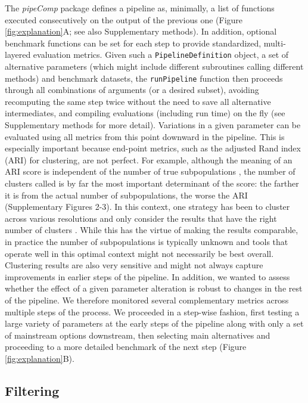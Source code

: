 \documentclass{bmcart}
\begin{document}
The \textit{pipeComp} package defines a pipeline as, minimally, a list of functions executed consecutively on the output of the previous one {\color{red}(Figure \ref{fig:explanation}A; see also Supplementary methods). In addition, optional benchmark functions can be set for each step to provide standardized, multi-layered evaluation metrics. Given such a \texttt{PipelineDefinition} object, a set of alternative parameters (which might include different subroutines calling different methods) and benchmark datasets, the \texttt{runPipeline} function then proceeds through all combinations of arguments (or a desired subset), avoiding recomputing the same step twice without the need to save all alternative intermediates, and compiling evaluations (including run time) on the fly (see Supplementary methods for more detail).} Variations in a given parameter can be evaluated using all metrics from this point downward in the pipeline. This is especially important because end-point metrics, such as the adjusted Rand index (ARI) \cite{HubertARI1985} for clustering, are not perfect. For example, although the meaning of an ARI score is independent of the number of true subpopulations \cite{steinleyProperties2004}, the number of clusters called is by far the most important determinant of the score: the farther it is from the actual number of subpopulations, the worse the ARI (Supplementary Figures 2-3). In this context, one strategy has been to cluster across various resolutions and only consider the results that have the right number of clusters \cite{duoClustering2018}. While this has the virtue of making the results comparable, in practice the number of subpopulations is typically unknown and tools that operate well in this optimal context might not necessarily be best overall. Clustering results are also very sensitive and might not always capture improvements in earlier steps of the pipeline. In addition, we wanted to assess whether the effect of a given parameter alteration is robust to changes in the rest of the pipeline. We therefore monitored several complementary metrics across multiple steps of the process. We proceeded in a step-wise fashion, first testing a large variety of parameters at the early steps of the pipeline along with only a set of mainstream options downstream, then selecting main alternatives and proceeding to a more detailed benchmark of the next step (Figure \ref{fig:explanation}B).

\subsection*{Filtering}
\end{document}
